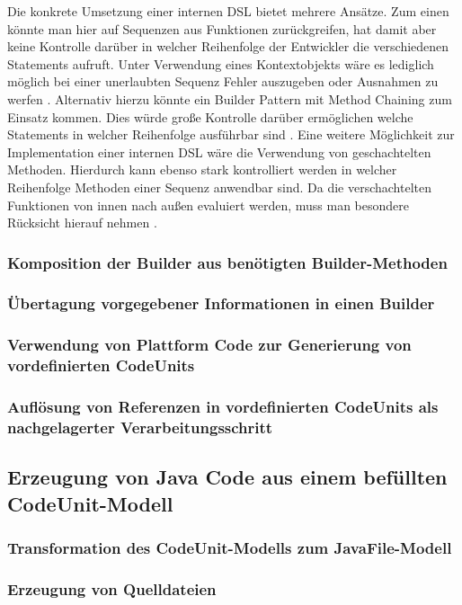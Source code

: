 \documentclass[12pt,oneside,a4paper,parskip]{scrbook}
\begin{document}
Die konkrete Umsetzung einer internen DSL bietet mehrere Ansätze. Zum einen könnte man hier auf Sequenzen aus Funktionen zurückgreifen, hat damit aber keine Kontrolle darüber in welcher Reihenfolge der Entwickler die verschiedenen Statements aufruft. Unter Verwendung eines Kontextobjekts wäre es lediglich möglich bei einer unerlaubten Sequenz Fehler auszugeben oder Ausnahmen zu werfen \cite[S. 351ff.]{fowler2010}. Alternativ hierzu könnte ein Builder Pattern mit Method Chaining zum Einsatz kommen. Dies würde große Kontrolle darüber ermöglichen welche Statements in welcher Reihenfolge ausführbar sind \cite[S. 343ff.]{fowler2010}. Eine weitere Möglichkeit zur Implementation einer internen DSL wäre die Verwendung von geschachtelten Methoden. Hierdurch kann ebenso stark kontrolliert werden in welcher Reihenfolge Methoden einer Sequenz anwendbar sind. Da die verschachtelten Funktionen von innen nach außen evaluiert werden, muss man besondere Rücksicht hierauf nehmen \cite[S. 357ff.]{fowler2010}.

\subsubsection{Komposition der Builder aus benötigten Builder-Methoden}
\subsubsection{Übertagung vorgegebener Informationen in einen Builder}
\subsubsection{Verwendung von Plattform Code zur Generierung von vordefinierten CodeUnits}
\subsubsection{Auflösung von Referenzen in vordefinierten CodeUnits als nachgelagerter Verarbeitungsschritt}
\subsection{Erzeugung von Java Code aus einem befüllten CodeUnit-Modell}
\subsubsection{Transformation des CodeUnit-Modells zum JavaFile-Modell}
\subsubsection{Erzeugung von Quelldateien}
\end{document}
